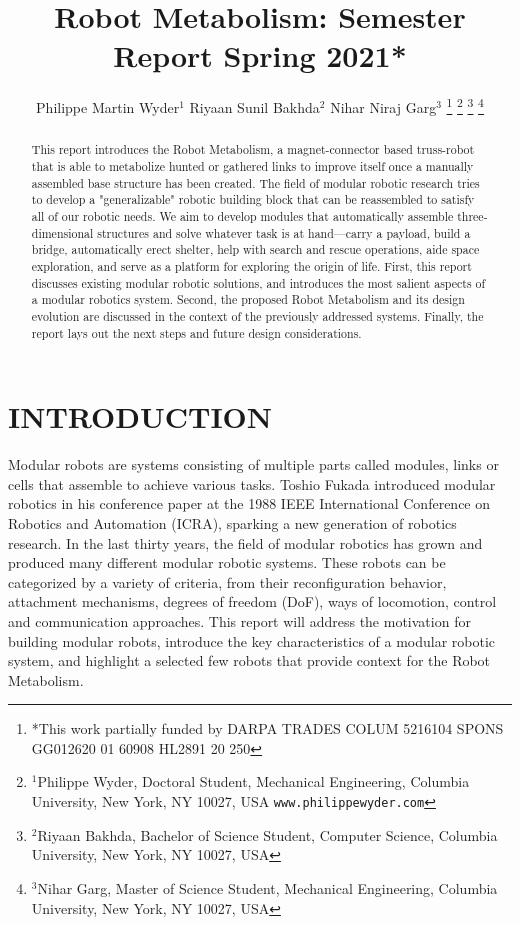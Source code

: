 \documentclass[letterpaper, 10 pt, conference]{ieeeconf}  %
\title{\LARGE \bf
Robot Metabolism: Semester Report Spring 2021*
}
\author{Philippe Martin Wyder$^{1}$ Riyaan Sunil Bakhda$^{2}$ Nihar Niraj Garg$^{3}$%
\thanks{*This work partially funded by DARPA TRADES COLUM 5216104 SPONS GG012620 01 60908 HL2891 20 250}%
\thanks{$^{1}$Philippe Wyder, Doctoral Student, Mechanical Engineering,
        Columbia University, New York, NY 10027, USA
        {\tt\small www.philippewyder.com}}%
\thanks{$^{2}$Riyaan Bakhda, Bachelor of Science Student, Computer Science,
        Columbia University, New York, NY 10027, USA}%
\thanks{$^{3}$Nihar Garg, Master of Science Student, Mechanical Engineering,
        Columbia University, New York, NY 10027, USA}%
}
\begin{document}
\maketitle
\thispagestyle{empty}
\pagestyle{empty}


\begin{abstract}

This report introduces the Robot Metabolism, a magnet-connector based truss-robot that is able to metabolize hunted or gathered links to improve itself once a manually assembled base structure has been created. The field of modular robotic research tries to develop a "generalizable" robotic building block that can be reassembled to satisfy all of our robotic needs. We aim to develop modules that automatically assemble three-dimensional structures and solve whatever task is at hand---carry a payload, build a bridge, automatically erect shelter, help with search and rescue operations, aide space exploration, and serve as a platform for exploring the origin of life. First, this report discusses existing modular robotic solutions, and introduces the most salient aspects of a modular robotics system. Second, the proposed Robot Metabolism and its design evolution are discussed in the context of the previously addressed systems. Finally, the report lays out the next steps and future design considerations.

\end{abstract}


\section{INTRODUCTION}

Modular robots are systems consisting of multiple parts called modules, links or cells that assemble to achieve various tasks. Toshio Fukada introduced modular robotics in his conference paper at the 1988 IEEE International Conference on Robotics and Automation (ICRA), sparking a new generation of robotics research\cite{FukudaDynamicallySystem}. In the last thirty years, the field of modular robotics has grown and produced many different modular robotic systems. These robots can be categorized by a variety of criteria, from their reconfiguration behavior, attachment mechanisms, degrees of freedom (DoF), ways of locomotion, control and communication approaches. This report will address the motivation for building modular robots, introduce the key characteristics of a modular robotic system, and highlight a selected few robots that provide context for the Robot Metabolism.
\end{document}
